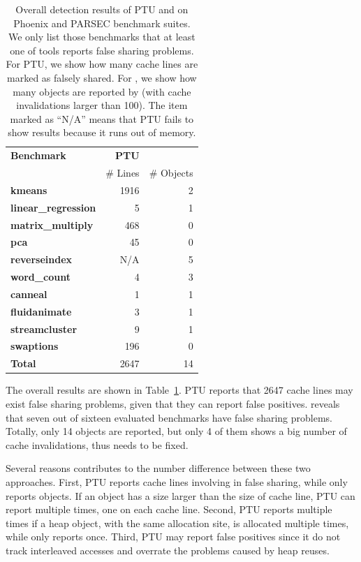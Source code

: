 \begin{table}
\centering
\begin{tabular}{l|r|r}
\hline
{\bf \small Benchmark} & {\bf \small PTU} & {\bf \small \sheriffdetect{}}\\
 & {\# Lines} & {\# Objects}\\
\hline
\small \textbf{kmeans} & 1916 &  2 \\
\small \textbf{linear\_regression} & 5 & 1 \\
\small \textbf{matrix\_multiply} & 468 & 0\\
\small \textbf{pca} & 45 & 0 \\
\small \textbf{reverseindex} & N/A & 5 \\
\small \textbf{word\_count} & 4 & 3\\
\hline
\small \textbf{canneal} & 1 & 1 \\
\small \textbf{fluidanimate} & 3 & 1 \\
\small \textbf{streamcluster} & 9 & 1\\
\small \textbf{swaptions} & 196 & 0\\
\hline
\small \textbf{Total} & 2647 & 14\\
\hline
\end{tabular}
\caption{Overall detection results of PTU and \sheriffdetect{} on Phoenix and PARSEC benchmark suites. We only list those benchmarks that at least one of tools reports false sharing problems. For PTU, we show how many cache lines are marked as falsely shared. For \sheriffdetect{}, we show how many objects are reported by \sheriffdetect{} (with cache invalidations larger than 100). The item marked as ``N/A'' means that PTU fails to show results because it runs out of memory.
\label{table:fsdetection}}
\end{table}


The overall results are shown in Table~\ref{table:fsdetection}. PTU reports that 2647 cache lines may exist false sharing problems, given that they can report false positives. \sheriffdetect{} reveals that seven out of sixteen evaluated benchmarks have false sharing problems. Totally, only 14 objects are reported, but only 4 of them shows a big number of cache invalidations, thus needs to be fixed. 

Several reasons contributes to the number difference between these two approaches. First, PTU reports cache lines involving in false sharing, while \SheriffDetect{} only reports objects. If an object has a size larger than the size of cache line, PTU can report multiple times, one on each cache line. Second, PTU reports multiple times if a heap object, with the same allocation site, is allocated multiple times, while \SheriffDetect{} only reports once. Third, PTU may report false positives since it do not track interleaved accesses and overrate the problems caused by heap reuses. 

